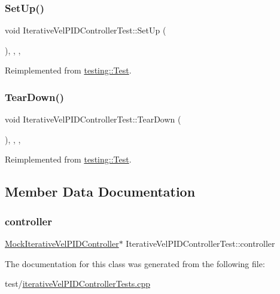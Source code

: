 \subsubsection{\texorpdfstring{SetUp()}{SetUp()}}
{\footnotesize\ttfamily void Iterative\+Vel\+P\+I\+D\+Controller\+Test\+::\+Set\+Up (\begin{DoxyParamCaption}{ }\end{DoxyParamCaption})\hspace{0.3cm}{\ttfamily [inline]}, {\ttfamily [override]}, {\ttfamily [protected]}, {\ttfamily [virtual]}}



Reimplemented from \mbox{\hyperlink{classtesting_1_1Test_a190315150c303ddf801313fd1a777733}{testing\+::\+Test}}.

\mbox{\label{classIterativeVelPIDControllerTest_a72c907e7a9f5b8cf3bec694086f247dc}} 
\subsubsection{\texorpdfstring{TearDown()}{TearDown()}}
{\footnotesize\ttfamily void Iterative\+Vel\+P\+I\+D\+Controller\+Test\+::\+Tear\+Down (\begin{DoxyParamCaption}{ }\end{DoxyParamCaption})\hspace{0.3cm}{\ttfamily [inline]}, {\ttfamily [override]}, {\ttfamily [protected]}, {\ttfamily [virtual]}}



Reimplemented from \mbox{\hyperlink{classtesting_1_1Test_a5f0ab439802cbe0ef7552f1a9f791923}{testing\+::\+Test}}.



\subsection{Member Data Documentation}
\mbox{\label{classIterativeVelPIDControllerTest_a05c720b442899f45f64c96117456b643}} 
\subsubsection{\texorpdfstring{controller}{controller}}
{\footnotesize\ttfamily \mbox{\hyperlink{classMockIterativeVelPIDController}{Mock\+Iterative\+Vel\+P\+I\+D\+Controller}}$\ast$ Iterative\+Vel\+P\+I\+D\+Controller\+Test\+::controller\hspace{0.3cm}{\ttfamily [protected]}}



The documentation for this class was generated from the following file\+:\begin{DoxyCompactItemize}
\item 
test/\mbox{\hyperlink{iterativeVelPIDControllerTests_8cpp}{iterative\+Vel\+P\+I\+D\+Controller\+Tests.\+cpp}}\end{DoxyCompactItemize}
